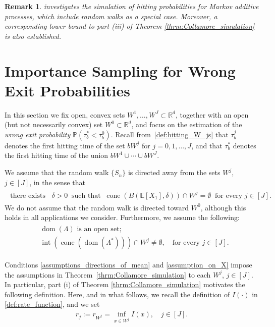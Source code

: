 \documentclass[aap,preprint]{imsart}
\newcommand{\Pro}{{\mathbb{P}}}
\newcommand{\Exp}{{\mathbb{E}}}
\theoremstyle{plain}
\newtheorem{remark}{Remark}[section]
\theoremstyle{definition}
\begin{document}
\begin{remark}
\cite{collamore2002} investigates the simulation of hitting probabilities for Markov additive processes, which include random walks as a special case. Moreover, a corresponding lower bound to part (iii) of Theorem \ref{thrm:Collamore_simulation} is also established.
\end{remark}

\section{Importance Sampling for Wrong Exit Probabilities}
\label{sec:prob_wrong_exit}
In this section we fix open, convex sets $W^1, \ldots, W^J \subset \mathbb{R}^d$, together with an open (but not necessarily convex) set $W^0 \subset \mathbb{R}^d$, and focus on the estimation of the \textit{wrong exit probability} $\Pro(\tau_b^* < \tau_b^0)$. Recall from~\eqref{def:hitting_W_js} that $\tau_b^j$ denotes the first hitting time of the set $bW^j$ for $j = 0,1,\ldots,J$, and that $\tau_b^*$ denotes the first hitting time of the union $bW^1 \cup \cdots \cup bW^J$.


We assume that  the random walk $\{S_n\}$ is directed away from the sets $W^j$, $j \in [J]$, in the sense that
\begin{align}\tag{C1}\label{assumptions_directions_of_mean}
\begin{split}
\text{there exists } \;\; \delta>0 \;\; \text{such that} \;\;  \operatorname{cone}(B(\Exp[X_1], \delta)) \cap W^j = \emptyset \;\; \text{for every } j \in [J].
\end{split}
\end{align}
We do not assume that the random walk is directed toward $W^0$, although this holds in all applications we consider. 
Furthermore,  we assume the following:
\begin{align} \tag{C2} \label{assumption_on_X}
    \begin{split}
        &\operatorname{dom}(\Lambda) \text{ is an open set}; \\
         &\operatorname{int}\left(\operatorname{cone}\left( \operatorname{dom}(\Lambda^*)\right)\right) \cap W^j \neq \emptyset, \quad \text{for  every }  j \in [J].
    \end{split}
\end{align}


Conditions \eqref{assumptions_directions_of_mean} and \eqref{assumption_on_X} impose the assumptions  in Theorem~\ref{thrm:Collamore_simulation} to each $W^j$, $j \in [J]$. In particular, part (i) of Theorem \ref{thrm:Collamore_simulation} motivates the following definition. Here, and in what follows, we recall the definition of  $I(\cdot)$  in \eqref{def:rate_function}, and we set
\begin{align}\label{def:rj_rstar}
r_j := r_{W^j} = \inf_{x \in W^j} I(x), \quad j \in [J].
\end{align}
\end{document}
